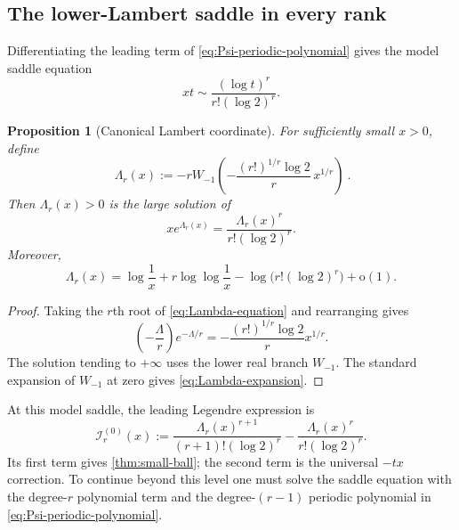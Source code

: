 \documentclass[11pt,a4paper]{article}
\theoremstyle{frontier}
\newtheorem{proposition}[theorem]{Proposition}
\theoremstyle{definition}
\newcommand{\smallo}{\mathrm o}
\begin{document}
\subsection{The lower-Lambert saddle in every rank}

Differentiating the leading term of \eqref{eq:Psi-periodic-polynomial} gives the model saddle equation
\begin{equation}\label{eq:model-saddle}
  xt\sim\frac{(\log t)^r}{r!(\log2)^r}.
\end{equation}

\begin{proposition}[Canonical Lambert coordinate]\label{prop:Lambert-coordinate}
For sufficiently small $x>0$, define
\begin{equation}\label{eq:Lambda-r}
 \boxed{\ 
 \Lambda_r(x):=-rW_{-1}\!\left(
 -\frac{(r!)^{1/r}\log2}{r}\,x^{1/r}
 \right)
 \ }.
\end{equation}
Then $\Lambda_r(x)>0$ is the large solution of
\begin{equation}\label{eq:Lambda-equation}
  xe^{\Lambda_r(x)}
  =\frac{\Lambda_r(x)^r}{r!(\log2)^r}.
\end{equation}
Moreover,
\begin{equation}\label{eq:Lambda-expansion}
 \Lambda_r(x)=\log\frac1x+r\log\log\frac1x
 -\log\!\bigl(r!(\log2)^r\bigr)+\smallo(1).
\end{equation}
\end{proposition}

\begin{proof}
Taking the $r$th root of \eqref{eq:Lambda-equation} and rearranging gives
\[
 \left(-\frac{\Lambda}{r}\right)e^{-\Lambda/r}
 =-\frac{(r!)^{1/r}\log2}{r}x^{1/r}.
\]
The solution tending to $+\infty$ uses the lower real branch $W_{-1}$.  The standard expansion of $W_{-1}$ at zero \cite{corless-lambert,dlmf-lambert} gives \eqref{eq:Lambda-expansion}.
\end{proof}

At this model saddle, the leading Legendre expression is
\begin{equation}\label{eq:model-rate}
 \mathscr I_r^{(0)}(x)
 :=\frac{\Lambda_r(x)^{r+1}}{(r+1)!(\log2)^r}
 -\frac{\Lambda_r(x)^r}{r!(\log2)^r}.
\end{equation}
Its first term gives \cref{thm:small-ball}; the second term is the universal $-tx$ correction.  To continue beyond this level one must solve the saddle equation with the degree-$r$ polynomial term and the degree-$(r-1)$ periodic polynomial in \eqref{eq:Psi-periodic-polynomial}.
\end{document}
